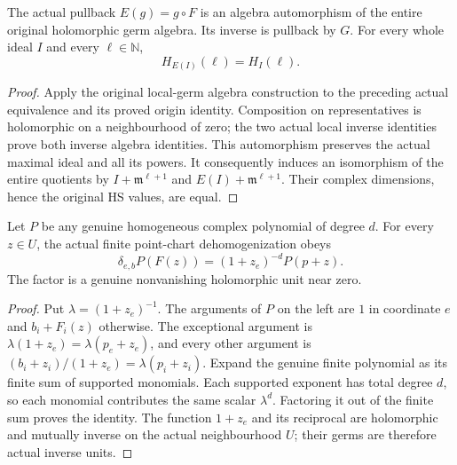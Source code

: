 \begin{theorem}
\label{hir:actual-point-unit-whole-germ-equivalence}
\leanok
The actual pullback $E(g)=g\circ F$ is an algebra automorphism of the
entire original holomorphic germ algebra. Its inverse is pullback by $G$.
For every whole ideal $I$ and every $\ell\in\mathbb N$,
\[
 H_{E(I)}(\ell)=H_I(\ell).
\]
\end{theorem}
\begin{proof}
Apply the original local-germ algebra construction to the preceding
actual equivalence and its proved origin identity. Composition on
representatives is holomorphic on a neighbourhood of zero; the two
actual local inverse identities prove both inverse algebra identities.
This automorphism preserves the actual maximal ideal and all its powers.
It consequently induces an isomorphism of the entire quotients by
$I+\mathfrak m^{\ell+1}$ and $E(I)+\mathfrak m^{\ell+1}$.
Their complex dimensions, hence the original HS values, are equal.
\end{proof}

\begin{theorem}
\label{hir:actual-point-unit-homogeneous-polynomial-dictionary}
\leanok
Let $P$ be any genuine homogeneous complex polynomial of degree $d$.
For every $z\in U$, the actual finite point-chart dehomogenization obeys
\[
 \delta_{e,b}P(F(z))=(1+z_e)^{-d}P(p+z).
\]
The factor is a genuine nonvanishing holomorphic unit near zero.
\end{theorem}
\begin{proof}
Put $\lambda=(1+z_e)^{-1}$. The arguments of $P$ on the left are
$1$ in coordinate $e$ and $b_i+F_i(z)$ otherwise. The exceptional
argument is $\lambda(1+z_e)=\lambda(p_e+z_e)$, and every other argument
is $(b_i+z_i)/(1+z_e)=\lambda(p_i+z_i)$.
Expand the genuine finite polynomial as its finite sum of supported
monomials. Each supported exponent has total degree $d$, so each
monomial contributes the same scalar $\lambda^d$. Factoring it out
of the finite sum proves the identity. The function $1+z_e$ and its
reciprocal are holomorphic and mutually inverse on the actual
neighbourhood $U$; their germs are therefore actual inverse units.
\end{proof}

